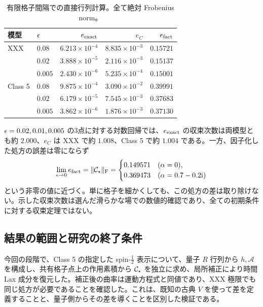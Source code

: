 \begin{table}[htbp]
\centering
\caption{有限格子間隔での直接行列計算。全て絶対 Frobenius norm。}
\label{audit5q:tab:eps}
\small
\begin{tabular}{llrrr}
\toprule
模型 & $\epsilon$ & $e_{\rm exact}$ & $e_C$ & $e_{\rm fact}$\\
\midrule
XXX & $0.08$ &$6.213\times10^{-4}$ &$8.835\times10^{-3}$ &$0.15721$\\
    & $0.02$ &$3.888\times10^{-5}$ &$2.116\times10^{-3}$ &$0.15137$\\
    & $0.005$ &$2.430\times10^{-6}$ &$5.235\times10^{-4}$ &$0.15001$\\
\addlinespace
Class 5 & $0.08$ &$9.875\times10^{-4}$ &$3.090\times10^{-2}$ &$0.39991$\\
        & $0.02$ &$6.179\times10^{-5}$ &$7.545\times10^{-3}$ &$0.37683$\\
        & $0.005$ &$3.862\times10^{-6}$ &$1.876\times10^{-3}$ &$0.37130$\\
\bottomrule
\end{tabular}
\end{table}

$\epsilon=0.02,0.01,0.005$ の3点に対する対数回帰では、$e_{\rm exact}$ の収束次数は両模型とも約 $2.000$、$e_C$ は XXX で約 $1.008$、Class 5 で約 $1.004$ である。一方、因子化した処方の誤差は零にならず
\begin{equation}
\lim_{\epsilon\to0} e_{\rm fact}=\|\mathcal C_{\star}\|_{\rm F}
=\begin{cases}
0.149571& (\alpha=0),\\
0.369473& (\alpha=0.7-0.2\mathrm i)
\end{cases}
\end{equation}
という非零の値に近づく。単に格子を細かくしても、この処方の差は取り除けない。示した収束次数は選んだ滑らかな場での数値的確認であり、全ての初期条件に対する収束定理ではない。

\subsection{結果の範囲と研究の終了条件}

今回の段階で、Class 5 の指定した spin-$\tfrac12$ 表示について、量子 $R$ 行列から $h,\mathcal A$ を構成し、共有格子点上の作用素積から $\mathcal C_{\star}$ を独立に求め、局所補正により時間 Lax 成分を復元した。補正後の曲率は運動方程式と同値であり、XXX 極限でも同じ処方が必要であることを確認した。これは、既知の古典 $V$ を使って差を定義することと、量子側からその差を導くことを区別した検証である。

